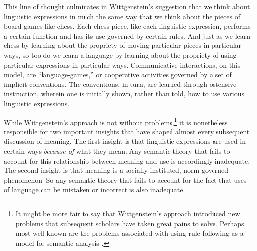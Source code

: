 This line of thought culminates in Wittgenstein's suggestion that we think about linguistic expressions in much the same way that we think about the pieces of board games like chess. Each chess piece, like each linguistic expression, performs a certain function and has its use governed by certain rules. And just as we learn chess by learning about the propriety of moving particular pieces in particular ways, so too do we learn a language by learning about the propriety of using particular expressions in particular ways. Communicative interactions, on this model, are ``language-games,'' or cooperative activities governed by a set of implicit conventions. The conventions, in turn, are learned through ostensive instruction, wherein one is initially shown, rather than told, how to use various linguistic expressions. 

While Wittgenstein's approach is not without problems,\footnote{It might be more fair to say that Wittgenstein's approach introduced new problems that subsequent scholars have taken great pains to solve. Perhaps most well-known are the problems associated with using rule-following as a model for semantic analysis \citep[see][]{Brandom:1994,Kripke:1982}.} it is nonetheless responsible for two important insights that have shaped almost every subsequent discussion of meaning. The first insight is that linguistic expressions are used in certain ways \textit{because of} what they mean. Any semantic theory that fails to account for this relationship between meaning and use is accordingly inadequate. The second insight is that meaning is a socially instituted, norm-governed phenomenon. So any semantic theory that fails to account for the fact that uses of language can be mistaken or incorrect is also inadequate.

